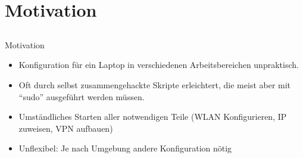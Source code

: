 
\section{Motivation}
\subsection{}
\begin{frame}[<+-| alert@+>]{Motivation}
	\begin{itemize}
		\item Konfiguration für ein Laptop in verschiedenen Arbeitsbereichen unpraktisch. \\
		\item Oft durch selbst zusammengehackte Skripte erleichtert, die meist aber mit ``sudo'' ausgeführt werden müssen.
		\item Umständliches Starten aller notwendigen Teile (WLAN Konfigurieren, IP zuweisen, VPN aufbauen)
		\item Unflexibel: Je nach Umgebung andere Konfiguration nötig
	\end{itemize}
\end{frame}
